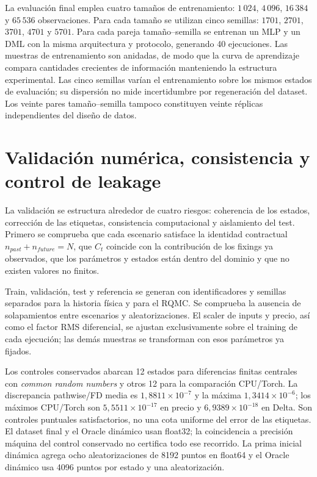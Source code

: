 La evaluación final emplea cuatro tamaños de entrenamiento: $1\,024$, $4\,096$,
$16\,384$ y $65\,536$ observaciones. Para cada tamaño se utilizan cinco semillas:
$1701$, $2701$, $3701$, $4701$ y $5701$. Para cada pareja tamaño--semilla se
entrenan un MLP y un DML con la misma arquitectura y protocolo, generando 40 ejecuciones. Las muestras
de entrenamiento son anidadas, de modo que la curva de aprendizaje compara
cantidades crecientes de información manteniendo la estructura experimental.
Las cinco semillas varían el entrenamiento sobre los mismos estados de evaluación;
su dispersión no mide incertidumbre por regeneración del dataset. Los veinte pares
tamaño--semilla tampoco constituyen veinte réplicas independientes del diseño de datos.

\section{Validación numérica, consistencia y control de leakage}
\label{sec:validation}

La validación se estructura alrededor de cuatro riesgos: coherencia de los
estados, corrección de las etiquetas, consistencia computacional y aislamiento
del test. Primero se comprueba que cada escenario satisface la identidad
contractual $n_{past}+n_{future}=N$, que $C_t$ coincide con la contribución de los
fixings ya observados, que los parámetros y estados están dentro del dominio y
que no existen valores no finitos.

Train, validación, test y referencia se generan con identificadores y semillas
separados para la historia física y para el RQMC. Se comprueba la ausencia de
solapamientos entre escenarios y aleatorizaciones. El scaler de inputs y precio,
así como el factor RMS diferencial, se ajustan exclusivamente sobre el training
de cada ejecución; las demás muestras se transforman con esos parámetros ya
fijados.

Los controles conservados abarcan 12 estados para diferencias finitas centrales
con \textit{common random numbers} y otros 12 para la comparación CPU/Torch.
La discrepancia pathwise/FD media es $1{,}8811\times10^{-7}$ y la máxima
$1{,}3414\times10^{-6}$; los máximos CPU/Torch son $5{,}5511\times10^{-17}$
en precio y $6{,}9389\times10^{-18}$ en Delta. Son controles puntuales satisfactorios,
no una cota uniforme del error de las etiquetas. El dataset final y el Oracle
dinámico usan float32; la coincidencia a precisión máquina del control conservado
no certifica todo ese recorrido. La prima inicial dinámica agrega ocho
aleatorizaciones de 8192 puntos en float64 y el Oracle dinámico usa 4096 puntos
por estado y una aleatorización.

